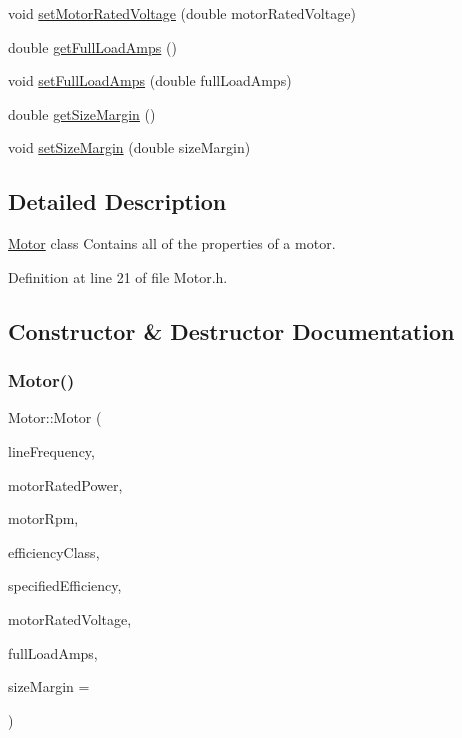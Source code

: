 \begin{DoxyCompactItemize}
\item 
void \hyperlink{class_motor_aab754019236e34cba0acd3632567515e}{set\+Motor\+Rated\+Voltage} (double motor\+Rated\+Voltage)
\item 
double \hyperlink{class_motor_a612eb0dabb9623ee8e0866046527d16a}{get\+Full\+Load\+Amps} ()
\item 
void \hyperlink{class_motor_a4bc8bf85c7749a0b7ff279d7eef20a2e}{set\+Full\+Load\+Amps} (double full\+Load\+Amps)
\item 
double \hyperlink{class_motor_aff485f55bed5b58d1454ce5c71bc0729}{get\+Size\+Margin} ()
\item 
void \hyperlink{class_motor_ab39a9375d17af151b6f9516674f37928}{set\+Size\+Margin} (double size\+Margin)
\end{DoxyCompactItemize}


\subsection{Detailed Description}
\hyperlink{class_motor}{Motor} class Contains all of the properties of a motor. 

Definition at line 21 of file Motor.\+h.



\subsection{Constructor \& Destructor Documentation}
\mbox{\label{class_motor_a529cb2685eef1f83ae6a775dd5e50ad9}} 
\subsubsection{\texorpdfstring{Motor()}{Motor()}}
{\footnotesize\ttfamily Motor\+::\+Motor (\begin{DoxyParamCaption}\item[{\hyperlink{class_motor_acee1bdf1b684ad36cb80dc2829d9fcee}{Line\+Frequency}}]{line\+Frequency,  }\item[{double}]{motor\+Rated\+Power,  }\item[{double}]{motor\+Rpm,  }\item[{\hyperlink{class_motor_afa022971ae062406a9f588c601673d4e}{Efficiency\+Class}}]{efficiency\+Class,  }\item[{double}]{specified\+Efficiency,  }\item[{double}]{motor\+Rated\+Voltage,  }\item[{double}]{full\+Load\+Amps,  }\item[{double}]{size\+Margin = {} }\end{DoxyParamCaption})\hspace{0.3cm}{\ttfamily [inline]}}

